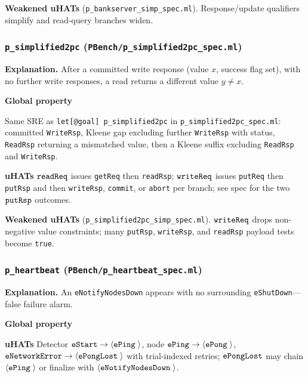\textbf{Weakened uHATs} (\texttt{p\_bankserver\_simp\_spec.ml}).
Response/update qualifiers simplify and read-query branches widen.

\subsubsection*{\texttt{p\_simplified2pc} (\texttt{PBench/p\_simplified2pc\_spec.ml})}
\textbf{Explanation.}
After a committed write response (value \(x\), success flag set), with no further write responses, a read returns a different value \(y\neq x\).

\textbf{Global property}
\vspace{-.35cm}\par\nobreak
{\small\noindent
Same SRE as \texttt{let[@goal] p\_simplified2pc} in \texttt{p\_simplified2pc\_spec.ml}: committed \texttt{WriteRsp}, Kleene gap excluding further \texttt{WriteRsp} with status, \texttt{ReadRsp} returning a mismatched value, then a Kleene suffix excluding \texttt{ReadRsp} and \texttt{WriteRsp}.%
\par}
\vspace{-.4cm}\par\nobreak\noindent
\textbf{uHATs}
\(\boldsymbol{{\tt readReq}}\) issues \texttt{getReq} then \texttt{readRsp}; \(\boldsymbol{{\tt writeReq}}\) issues \texttt{putReq} then \texttt{putRsp} and then \texttt{writeRsp}, \texttt{commit}, or \texttt{abort} per branch; see spec for the two \(\boldsymbol{{\tt putRsp}}\) outcomes.

\textbf{Weakened uHATs} (\texttt{p\_simplified2pc\_simp\_spec.ml}).
\(\boldsymbol{{\tt writeReq}}\) drops non-negative value constraints; many \texttt{putRsp}, \texttt{writeRsp}, and \texttt{readRsp} payload tests become \texttt{true}.

\subsubsection*{\texttt{p\_heartbeat} (\texttt{PBench/p\_heartbeat\_spec.ml})}
\textbf{Explanation.}
An \texttt{eNotifyNodesDown} appears with no surrounding \texttt{eShutDown}---false failure alarm.

\textbf{Global property}
\vspace{-.35cm}\par{}
\vspace{-.4cm}\par\nobreak\noindent
\textbf{uHATs}
Detector \(\boldsymbol{{\tt eStart}}\rightarrow{\langle} {\boldsymbol{{\tt ePing}}\;{}} {\rangle}\), node \(\boldsymbol{{\tt ePing}}\rightarrow{\langle} {\boldsymbol{{\tt ePong}}\;{}} {\rangle}\), \(\boldsymbol{{\tt eNetworkError}}\rightarrow{\langle} {\boldsymbol{{\tt ePongLost}}\;{}} {\rangle}\) with trial-indexed retries; \(\boldsymbol{{\tt ePongLost}}\) may chain \({\langle} {\boldsymbol{{\tt ePing}}\;{}} {\rangle}\) or finalize with \({\langle} {\boldsymbol{{\tt eNotifyNodesDown}}\;{}} {\rangle}\).

